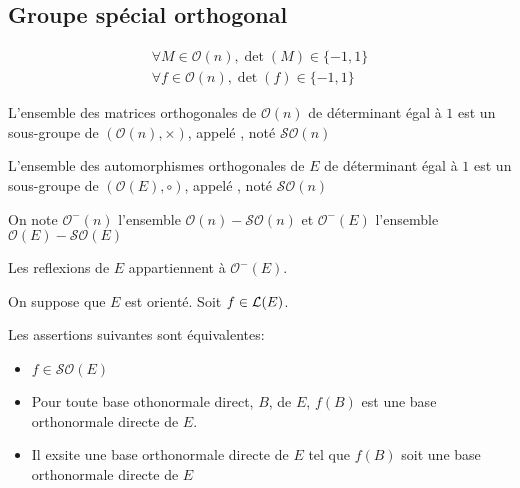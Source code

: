 \subsection{Groupe spécial orthogonal}

\begin{prp}
\begin{gather*}
    \forall M \in \mathcal{O}(n), \det(M) \in \{-1, 1\} \\
    \forall f \in \mathcal{O}(n), \det(f) \in \{-1, 1\}
\end{gather*}
\end{prp}

\begin{dfn}
L'ensemble des matrices orthogonales de $\mathcal{O}(n)$ de déterminant
égal à $1$ est un sous-groupe de $(\mathcal{O}(n), \times)$, appelé
, noté $\mathcal{SO}(n)$
\end{dfn}

\begin{dfn}
L'ensemble des automorphismes orthogonales de $E$ de
déterminant égal à $1$ est un sous-groupe de $(\mathcal{O}(E), \circ)$,
appelé , noté
$\mathcal{SO}(n)$
\end{dfn}

\begin{dfn}
On note $\mathcal{O}^-(n)$ l'ensemble $\mathcal{O}(n) - \mathcal{SO}(n)$
et $\mathcal{O}^-(E)$ l'ensemble $\mathcal{O}(E) - \mathcal{SO}(E)$
\end{dfn}

\begin{prp}
Les reflexions de $E$ appartiennent à $\mathcal{O}^-(E)$.
\end{prp}

\begin{prp}
On suppose que $E$ est orienté. Soit $f \in \operatorname{\mathcal{L}}(E)$.

Les assertions suivantes sont équivalentes:
\begin{itemize}
    \item $f \in \mathcal{SO}(E)$
    \item Pour toute base othonormale direct, $B$, de $E$, $f(B)$ est une
        base orthonormale directe de $E$.
    \item Il exsite une base orthonormale directe de $E$ tel que $f(B)$
        soit une base orthonormale directe de $E$
\end{itemize}
\end{prp}

